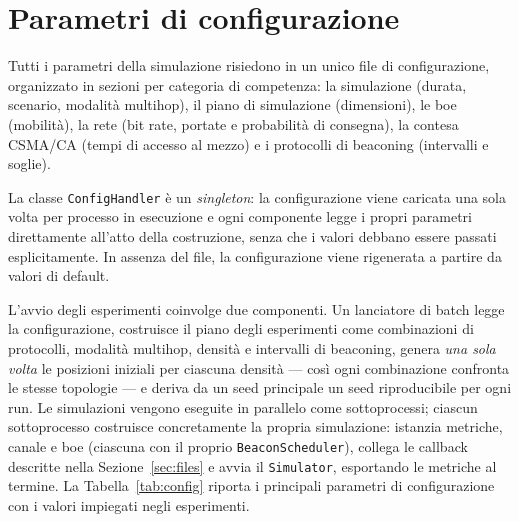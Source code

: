 \section{Parametri di configurazione}
\label{sec:config}
Tutti i parametri della simulazione risiedono in un unico file di configurazione,
organizzato in sezioni per categoria di competenza: la simulazione (durata, scenario,
modalit\`a multihop), il piano di simulazione (dimensioni), le boe (mobilit\`a), la rete
(bit rate, portate e probabilit\`a di consegna), la contesa CSMA/CA (tempi di accesso al
mezzo) e i protocolli di beaconing (intervalli e soglie).

La classe \texttt{ConfigHandler} \`e un \emph{singleton}: la configurazione viene
caricata una sola volta per processo in esecuzione e ogni componente legge i propri
parametri direttamente all'atto della costruzione, senza che i valori debbano essere
passati esplicitamente. In assenza del file, la configurazione viene rigenerata a
partire da valori di default.

L'avvio degli esperimenti coinvolge due componenti. Un lanciatore di batch
legge la configurazione, costruisce il piano degli esperimenti come combinazioni
di protocolli, modalit\`a multihop, densit\`a e intervalli di beaconing, genera
\emph{una sola volta} le posizioni iniziali per ciascuna densit\`a --- cos\`i ogni
combinazione confronta le stesse topologie --- e deriva da un seed principale un seed
riproducibile per ogni run.
Le simulazioni vengono eseguite in parallelo come sottoprocessi; ciascun sottoprocesso
costruisce concretamente la propria simulazione: istanzia metriche,
canale e boe (ciascuna con il proprio \texttt{BeaconScheduler}), collega le callback
descritte nella Sezione~\ref{sec:files} e avvia il \texttt{Simulator}, esportando le
metriche al termine. La Tabella~\ref{tab:config} riporta i principali parametri di
configurazione con i valori impiegati negli esperimenti.

